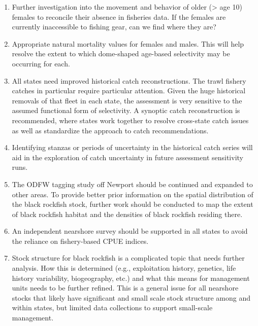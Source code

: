 \documentclass[11pt,
  english,
  letterpaper,
]{article}
\providecommand{\tightlist}{%
  \setlength{\itemsep}{0pt}\setlength{\parskip}{0pt}}
\providecommand{\tightlist}{%
  \setlength{\itemsep}{0pt}\setlength{\parskip}{0pt}}
\begin{document}
\begin{enumerate}
\def\labelenumi{\arabic{enumi}.}
\tightlist
\item
  Further investigation into the movement and behavior of older (\textgreater{} age 10) females to reconcile their absence in fisheries data. If the females are currently inaccessible to fishing gear, can we find where they are?
\item
  Appropriate natural mortality values for females and males. This will help resolve the extent to which dome-shaped age-based selectivity may be occurring for each.
\item
  All states need improved historical catch reconstructions. The trawl fishery catches in particular require particular attention. Given the huge historical removals of that fleet in each state, the assessment is very sensitive to the assumed functional form of selectivity. A synoptic catch reconstruction is recommended, where states work together to resolve cross-state catch issues as well as standardize the approach to catch recommendations.
\item
  Identifying stanzas or periods of uncertainty in the historical catch series will aid in the exploration of catch uncertainty in future assessment sensitivity runs.
\item
  The ODFW tagging study off Newport should be continued and expanded to other areas. To provide better prior information on the spatial distribution of the black rockfish stock, further work should be conducted to map the extent of black rockfish habitat and the densities of black rockfish residing there.
\item
  An independent nearshore survey should be supported in all states to avoid the reliance on fishery-based CPUE indices.
\item
  Stock structure for black rockfish is a complicated topic that needs further analysis. How this is determined (e.g., exploitation history, genetics, life history variability, biogeography, etc.) and what this means for management units needs to be further refined. This is a general issue for all nearshore stocks that likely have significant and small scale stock structure among and within states, but limited data collections to support small-scale management.
\end{enumerate}

\vspace{500cm}

\pagebreak
\setlength{\parskip}{5mm plus1mm minus1mm}
\setcounter{page}{1}
\renewcommand{\thefigure}{\arabic{figure}}
\renewcommand{\thetable}{\arabic{table}}
\setcounter{table}{0}
\setcounter{figure}{0}
\end{document}
